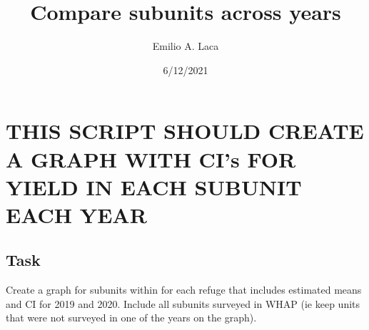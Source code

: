 \documentclass[
]{article}
\title{Compare subunits across years}
\author{Emilio A. Laca}
\date{6/12/2021}
\begin{document}
\maketitle

\hypertarget{this-script-should-create-a-graph-with-cis-for-yield-in-each-subunit-each-year}{%
\section{THIS SCRIPT SHOULD CREATE A GRAPH WITH CI's FOR YIELD IN EACH
SUBUNIT EACH
YEAR}\label{this-script-should-create-a-graph-with-cis-for-yield-in-each-subunit-each-year}}

\hypertarget{task}{%
\subsection{Task}\label{task}}

Create a graph for subunits within for each refuge that includes
estimated means and CI for 2019 and 2020. Include all subunits surveyed
in WHAP (ie keep units that were not surveyed in one of the years on the
graph).
\end{document}
